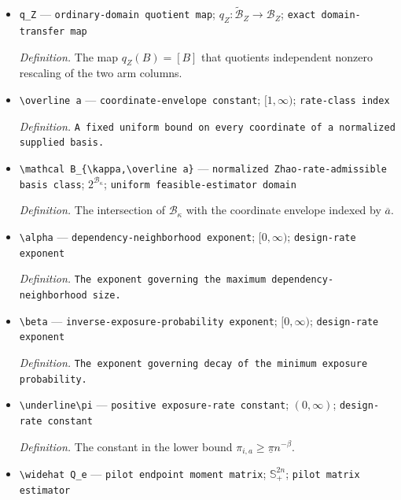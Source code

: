 \documentclass{article}
\begin{document}
\begin{itemize}
  \item \texttt{q\_\allowbreak{}Z} --- \texttt{ordinary-\allowbreak{}domain quotient map}; \(q_Z:\widetilde{\mathcal B}_Z\to\mathcal B_Z\); \texttt{exact domain-\allowbreak{}transfer map}
  \par\smallskip\noindent\emph{Definition.} The map \(q_Z(B)=[B]\) that quotients independent nonzero rescaling of the two arm columns.
  \item \texttt{\textbackslash{}\allowbreak{}overline a} --- \texttt{coordinate-\allowbreak{}envelope constant}; \([1,\infty)\); \texttt{rate-\allowbreak{}class index}
  \par\smallskip\noindent\emph{Definition.} \texttt{A fixed uniform bound on every coordinate of a normalized supplied basis.}
  \item \texttt{\textbackslash{}\allowbreak{}mathcal B\_\allowbreak{}\{\textbackslash{}\allowbreak{}kappa,\allowbreak{}\textbackslash{}\allowbreak{}overline a\}\allowbreak{}} --- \texttt{normalized Zhao-\allowbreak{}rate-\allowbreak{}admissible basis class}; \(2^{\mathcal B_\kappa}\); \texttt{uniform feasible-\allowbreak{}estimator domain}
  \par\smallskip\noindent\emph{Definition.} The intersection of \(\mathcal B_\kappa\) with the coordinate envelope indexed by \(\overline a\).
  \item \texttt{\textbackslash{}\allowbreak{}alpha} --- \texttt{dependency-\allowbreak{}neighborhood exponent}; \([0,\infty)\); \texttt{design-\allowbreak{}rate exponent}
  \par\smallskip\noindent\emph{Definition.} \texttt{The exponent governing the maximum dependency-\allowbreak{}neighborhood size.}
  \item \texttt{\textbackslash{}\allowbreak{}beta} --- \texttt{inverse-\allowbreak{}exposure-\allowbreak{}probability exponent}; \([0,\infty)\); \texttt{design-\allowbreak{}rate exponent}
  \par\smallskip\noindent\emph{Definition.} \texttt{The exponent governing decay of the minimum exposure probability.}
  \item \texttt{\textbackslash{}\allowbreak{}underline\textbackslash{}\allowbreak{}pi} --- \texttt{positive exposure-\allowbreak{}rate constant}; \((0,\infty)\); \texttt{design-\allowbreak{}rate constant}
  \par\smallskip\noindent\emph{Definition.} The constant in the lower bound \(\pi_{i,a}\ge\underline\pi n^{-\beta}\).
  \item \texttt{\textbackslash{}\allowbreak{}widehat Q\_\allowbreak{}e} --- \texttt{pilot endpoint moment matrix}; \(\mathbb S_+^{2n}\); \texttt{pilot matrix estimator}

\end{itemize}
\end{document}
